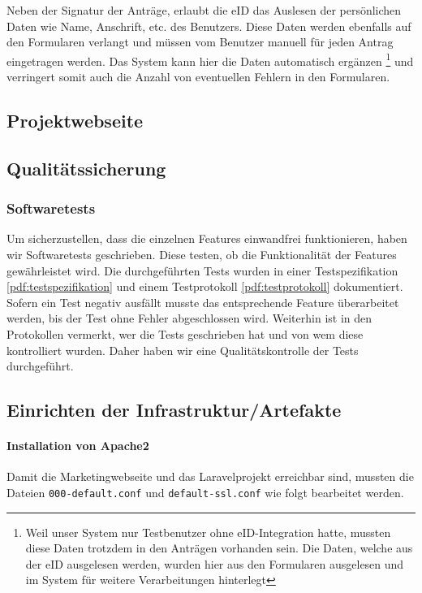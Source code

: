 \documentclass[12pt,a4paper]{scrartcl}
\newcommand{\code}[1]{\texttt{#1}}
\begin{document}
Neben der Signatur der Anträge, erlaubt die eID das Auslesen der persönlichen Daten wie Name, Anschrift, etc. des Benutzers.
Diese Daten werden ebenfalls auf den Formularen verlangt und müssen vom Benutzer manuell für jeden Antrag eingetragen werden.
Das System kann hier die Daten automatisch ergänzen 
 \footnote{Weil unser System nur Testbenutzer ohne eID-Integration hatte, mussten diese Daten trotzdem in den Anträgen vorhanden sein.
Die Daten, welche aus der eID ausgelesen werden, wurden hier aus den Formularen ausgelesen und im System für weitere Verarbeitungen hinterlegt}
und verringert somit auch die Anzahl von eventuellen Fehlern in den Formularen.

\subsection{Projektwebseite}

\subsection{Qualitätssicherung}
\label{qualitiyassurance}
\subsubsection{Softwaretests}
Um sicherzustellen, dass die einzelnen Features einwandfrei funktionieren, haben wir Softwaretests geschrieben.
Diese testen, ob die Funktionalität der Features gewährleistet wird.
Die durchgeführten Tests wurden in einer Testspezifikation \ref{pdf:testspezifikation} und einem Testprotokoll \ref{pdf:testprotokoll} dokumentiert.
Sofern ein Test negativ ausfällt musste das entsprechende Feature überarbeitet werden, 
bis der Test ohne Fehler abgeschlossen wird.
Weiterhin ist in den Protokollen vermerkt, wer die Tests geschrieben hat und von wem diese kontrolliert wurden.
Daher haben wir eine Qualitätskontrolle der Tests durchgeführt.

\subsection{Einrichten der Infrastruktur/Artefakte}

\paragraph{Installation von Apache2}
Damit die Marketingwebseite und das Laravelprojekt erreichbar sind, mussten die Dateien \code{000-default.conf} und \code{default-ssl.conf} wie folgt bearbeitet werden.
\end{document}
